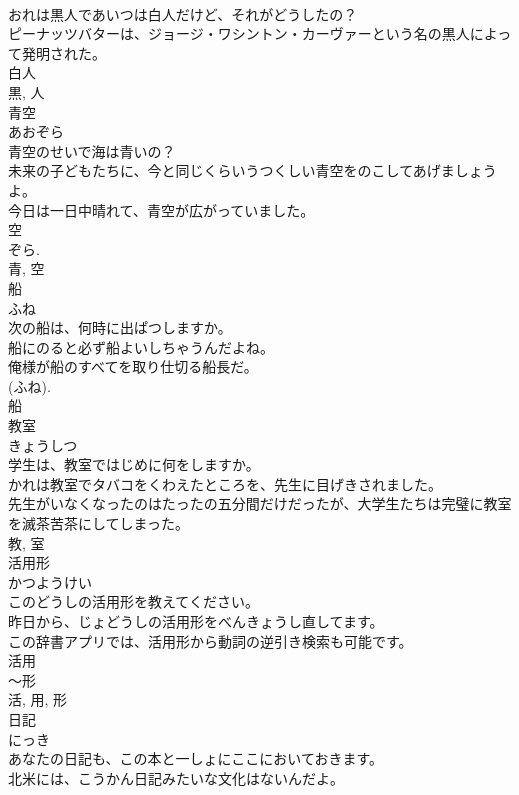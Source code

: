 \documentclass[8pt]{extreport}
\begin{document}
\begin{CJK}{UTF8}{min}
\\	おれは黒人であいつは白人だけど、それがどうしたの？	
\\	ピーナッツバターは、ジョージ・ワシントン・カーヴァーという名の黒人によって発明された。	
\\	白人 
\\	黒, 人	
\\	青空	
\\	あおぞら	
\\	青空のせいで海は青いの？	
\\	未来の子どもたちに、今と同じくらいうつくしい青空をのこしてあげましょうよ。	
\\	今日は一日中晴れて、青空が広がっていました。	
\\	空 
\\	ぞら.
\\	青, 空	
\\	船	
\\	ふね	
\\	次の船は、何時に出ぱつしますか。	
\\	船にのると必ず船よいしちゃうんだよね。	
\\	俺様が船のすべてを取り仕切る船長だ。	
\\	(ふね). 
\\	船	
\\	教室	
\\	きょうしつ	
\\	学生は、教室ではじめに何をしますか。	
\\	かれは教室でタバコをくわえたところを、先生に目げきされました。	
\\	先生がいなくなったのはたったの五分間だけだったが、大学生たちは完璧に教室を滅茶苦茶にしてしまった。	
\\	教, 室	
\\	活用形	
\\	かつようけい	
\\	このどうしの活用形を教えてください。	
\\	昨日から、じょどうしの活用形をべんきょうし直してます。	
\\	この辞書アプリでは、活用形から動詞の逆引き検索も可能です。	
\\	活用 
\\	〜形 
\\	活, 用, 形	
\\	日記	
\\	にっき	
\\	あなたの日記も、この本と一しょにここにおいておきます。	
\\	北米には、こうかん日記みたいな文化はないんだよ。	

\end{CJK}
\end{document}
